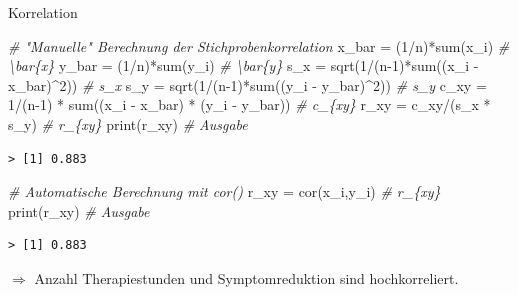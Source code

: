 \documentclass[
  8pt,
  ignorenonframetext,
]{beamer}
\newenvironment{Shaded}{\begin{snugshade}}{\end{snugshade}}
\newcommand{\CommentTok}[1]{\textcolor[rgb]{0.56,0.35,0.01}{\textit{#1}}}
\newcommand{\DecValTok}[1]{\textcolor[rgb]{0.00,0.00,0.81}{#1}}
\newcommand{\FunctionTok}[1]{\textcolor[rgb]{0.00,0.00,0.00}{#1}}
\newcommand{\NormalTok}[1]{#1}
\newcommand{\OtherTok}[1]{\textcolor[rgb]{0.56,0.35,0.01}{#1}}
\newcommand{\SpecialCharTok}[1]{\textcolor[rgb]{0.00,0.00,0.00}{#1}}
\begin{document}
\begin{frame}[fragile]{Korrelation}
\begin{Shaded}
\begin{Highlighting}[]
\CommentTok{\# "Manuelle" Berechnung der Stichprobenkorrelation}
\NormalTok{x\_bar }\OtherTok{=}\NormalTok{ (}\DecValTok{1}\SpecialCharTok{/}\NormalTok{n)}\SpecialCharTok{*}\FunctionTok{sum}\NormalTok{(x\_i)                                                           }\CommentTok{\# \textbackslash{}bar\{x\}}
\NormalTok{y\_bar }\OtherTok{=}\NormalTok{ (}\DecValTok{1}\SpecialCharTok{/}\NormalTok{n)}\SpecialCharTok{*}\FunctionTok{sum}\NormalTok{(y\_i)                                                           }\CommentTok{\# \textbackslash{}bar\{y\}}
\NormalTok{s\_x   }\OtherTok{=} \FunctionTok{sqrt}\NormalTok{(}\DecValTok{1}\SpecialCharTok{/}\NormalTok{(n}\DecValTok{{-}1}\NormalTok{)}\SpecialCharTok{*}\FunctionTok{sum}\NormalTok{((x\_i }\SpecialCharTok{{-}}\NormalTok{ x\_bar)}\SpecialCharTok{\^{}}\DecValTok{2}\NormalTok{))                                       }\CommentTok{\# s\_x}
\NormalTok{s\_y   }\OtherTok{=} \FunctionTok{sqrt}\NormalTok{(}\DecValTok{1}\SpecialCharTok{/}\NormalTok{(n}\DecValTok{{-}1}\NormalTok{)}\SpecialCharTok{*}\FunctionTok{sum}\NormalTok{((y\_i }\SpecialCharTok{{-}}\NormalTok{ y\_bar)}\SpecialCharTok{\^{}}\DecValTok{2}\NormalTok{))                                       }\CommentTok{\# s\_y}
\NormalTok{c\_xy  }\OtherTok{=} \DecValTok{1}\SpecialCharTok{/}\NormalTok{(n}\DecValTok{{-}1}\NormalTok{) }\SpecialCharTok{*} \FunctionTok{sum}\NormalTok{((x\_i }\SpecialCharTok{{-}}\NormalTok{ x\_bar) }\SpecialCharTok{*}\NormalTok{ (y\_i }\SpecialCharTok{{-}}\NormalTok{ y\_bar))                             }\CommentTok{\# c\_\{xy\}}
\NormalTok{r\_xy  }\OtherTok{=}\NormalTok{ c\_xy}\SpecialCharTok{/}\NormalTok{(s\_x }\SpecialCharTok{*}\NormalTok{ s\_y)                                                         }\CommentTok{\# r\_\{xy\}}
\FunctionTok{print}\NormalTok{(r\_xy)                                                                      }\CommentTok{\# Ausgabe}
\end{Highlighting}
\end{Shaded}

\begin{verbatim}
> [1] 0.883
\end{verbatim}

\begin{Shaded}
\begin{Highlighting}[]
\CommentTok{\# Automatische Berechnung mit cor()}
\NormalTok{r\_xy  }\OtherTok{=} \FunctionTok{cor}\NormalTok{(x\_i,y\_i)                                                             }\CommentTok{\# r\_\{xy\}}
\FunctionTok{print}\NormalTok{(r\_xy)                                                                      }\CommentTok{\# Ausgabe}
\end{Highlighting}
\end{Shaded}

\begin{verbatim}
> [1] 0.883
\end{verbatim}

\center
\small

\(\Rightarrow\) Anzahl Therapiestunden und Symptomreduktion sind
hochkorreliert.
\end{frame}
\end{document}
